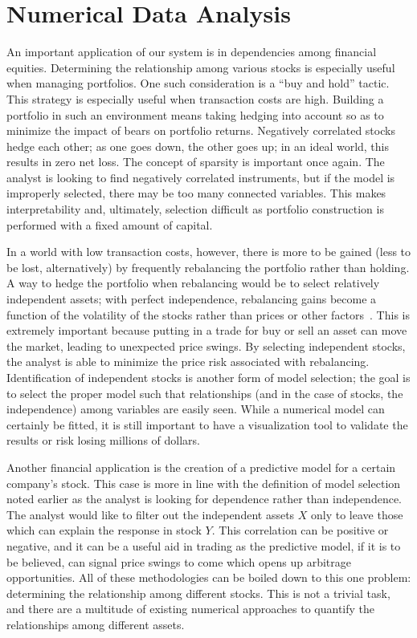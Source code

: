 
\chapter{Numerical Data Analysis \label{ch:numerical}}

An important application of our system is in dependencies among financial equities. Determining the relationship among various stocks is especially useful when managing portfolios. One such consideration is a ``buy and hold'' tactic. This strategy is especially useful when transaction costs are high. Building a portfolio in such an environment means taking hedging into account so as to minimize the impact of bears on portfolio returns. Negatively correlated stocks hedge each other; as one goes down, the other goes up; in an ideal world, this results in zero net loss. The concept of sparsity is important once again. The analyst is looking to find negatively correlated instruments, but if the model is improperly selected, there may be too many connected variables. This makes interpretability and, ultimately, selection difficult as portfolio construction is performed with a fixed amount of capital.

In a world with low transaction costs, however, there is more to be gained (less to be lost, alternatively) by frequently rebalancing the portfolio rather than holding. A way to hedge the portfolio when rebalancing would be to select relatively independent assets; with perfect independence, rebalancing gains become a function of the volatility of the stocks rather than prices or other factors~\cite{liuh2016}. This is extremely important because putting in a trade for buy or sell an asset can move the market, leading to unexpected price swings. By selecting independent stocks, the analyst is able to minimize the price risk associated with rebalancing. Identification of independent stocks is another form of model selection; the goal is to select the proper model such that relationships (and in the case of stocks, the independence) among variables are easily seen. While a numerical model can certainly be fitted, it is still important to have a visualization tool to validate the results or risk losing millions of dollars.

Another financial application is the creation of a predictive model for a certain company's stock. This case is more in line with the definition of model selection noted earlier as the analyst is looking for dependence rather than independence. The analyst would like to filter out the independent assets $X$ only to leave those which can explain the response in stock $Y$. This correlation can be positive or negative, and it can be a useful aid in trading as the predictive model, if it is to be believed, can signal price swings to come which opens up arbitrage opportunities. All of these methodologies can be boiled down to this one problem: determining the relationship among different stocks. This is not a trivial task, and there are a multitude of existing numerical approaches to quantify the relationships among different assets. 





